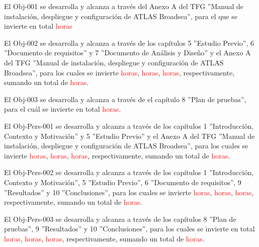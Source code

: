 

El Obj-001 se desarrolla y alcanza a través del Anexo A del TFG ''Manual de instalación, despliegue y configuración de ATLAS Broadsea'', para el que se invierte en total \textcolor{red}{horas} 

El Obj-002 se desarrolla y alcanza a través de los capítulos 5 ''Estudio Previo'', 6 ''Documento de requisitos'' y 7 ''Documento de Análisis y Diseño'' y el Anexo A del TFG ''Manual de instalación, despliegue y configuración de ATLAS Broadsea'', para los cuales se invierte \textcolor{red}{horas}, \textcolor{red}{horas}, \textcolor{red}{horas}, respectivamente, sumando un total de \textcolor{red}{horas}.

El Obj-003 se desarrolla y alcanza a través de el capítulo 8 ''Plan de pruebas'', para el cuál se invierte en total \textcolor{red}{horas}.



El Obj-Pers-001  se desarrolla y alcanza a través de los capítulos 1 ''Introducción, Contexto y Motivación'' y 5 ''Estudio Previo'' y el Anexo A del TFG ''Manual de instalación, despliegue y configuración de ATLAS Broadsea'', para los cuales se invierte \textcolor{red}{horas}, \textcolor{red}{horas}, \textcolor{red}{horas}, respectivamente, sumando un total de \textcolor{red}{horas}.

El Obj-Pers-002 se desarrolla y alcanza a través de los capítulos 1 ''Introducción, Contexto y Motivación'', 5 ''Estudio Previo'',  6 ''Documento de requisitos'', 9 ''Resultados'' y 10 ''Conclusiones'', para los cuales se invierte \textcolor{red}{horas}, \textcolor{red}{horas}, \textcolor{red}{horas}, respectivamente, sumando un total de \textcolor{red}{horas}.

El Obj-Pers-003 se desarrolla y alcanza a través de los capítulos  8 ''Plan de pruebas'', 9 ''Resultados'' y 10 ''Conclusiones'', para los cuales se invierte en total \textcolor{red}{horas}, \textcolor{red}{horas}, \textcolor{red}{horas}, respectivamente, sumando un total de \textcolor{red}{horas}.
